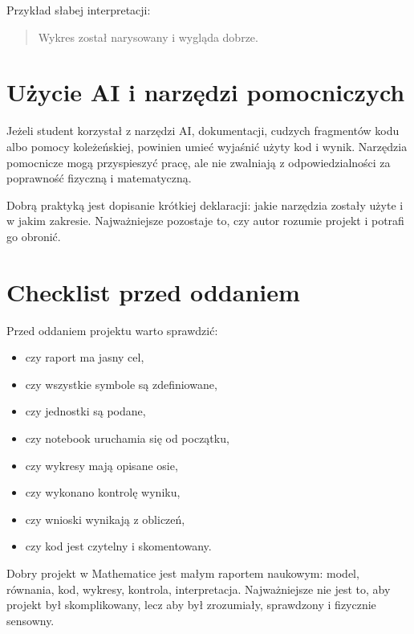 Przykład słabej interpretacji:
\begin{quote}
Wykres został narysowany i wygląda dobrze.
\end{quote}

\section{Użycie AI i narzędzi pomocniczych}

Jeżeli student korzystał z narzędzi AI, dokumentacji, cudzych fragmentów kodu albo
pomocy koleżeńskiej, powinien umieć wyjaśnić użyty kod i wynik. Narzędzia
pomocnicze mogą przyspieszyć pracę, ale nie zwalniają z odpowiedzialności za
poprawność fizyczną i matematyczną.

Dobrą praktyką jest dopisanie krótkiej deklaracji: jakie narzędzia zostały użyte
i w jakim zakresie. Najważniejsze pozostaje to, czy autor rozumie projekt i
potrafi go obronić.

\section{Checklist przed oddaniem}

Przed oddaniem projektu warto sprawdzić:
\begin{itemize}
    \item czy raport ma jasny cel,
    \item czy wszystkie symbole są zdefiniowane,
    \item czy jednostki są podane,
    \item czy notebook uruchamia się od początku,
    \item czy wykresy mają opisane osie,
    \item czy wykonano kontrolę wyniku,
    \item czy wnioski wynikają z obliczeń,
    \item czy kod jest czytelny i skomentowany.
\end{itemize}

\begin{summarybox}
Dobry projekt w Mathematice jest małym raportem naukowym: model, równania, kod,
wykresy, kontrola, interpretacja. Najważniejsze nie jest to, aby projekt był
skomplikowany, lecz aby był zrozumiały, sprawdzony i fizycznie sensowny.
\end{summarybox}
